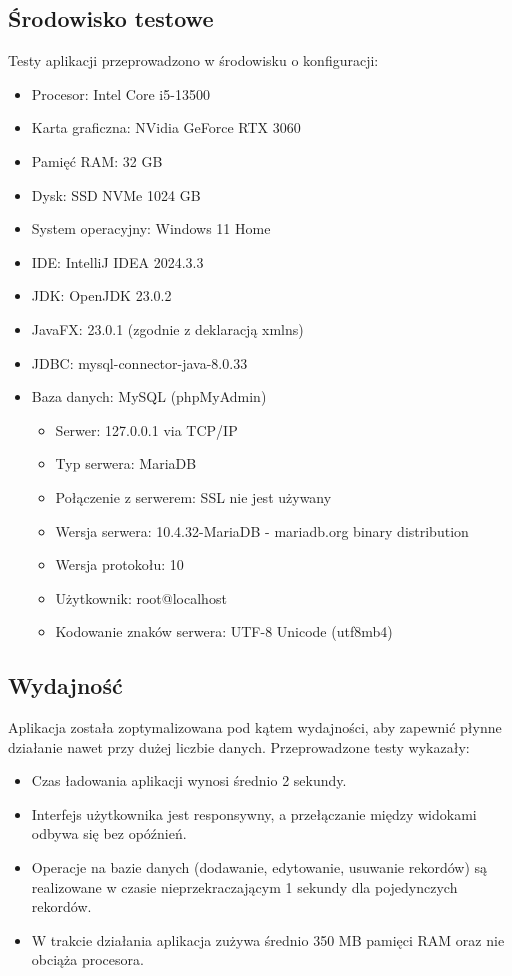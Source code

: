 \subsection{Środowisko testowe}
\label{sec:srodowiskoTestowe}
Testy aplikacji przeprowadzono w środowisku o konfiguracji:
\begin{itemize}
  \item Procesor: Intel Core i5-13500
  \item Karta graficzna: NVidia GeForce RTX 3060
  \item Pamięć RAM: 32 GB
  \item Dysk: SSD NVMe 1024 GB
  \item System operacyjny: Windows 11 Home
  \item IDE: IntelliJ IDEA 2024.3.3
  \item JDK: OpenJDK 23.0.2
  \item JavaFX: 23.0.1 (zgodnie z deklaracją xmlns)
  \item JDBC: mysql-connector-java-8.0.33
  \newpage
  \item Baza danych: MySQL (phpMyAdmin)
    \begin{itemize}
        \item Serwer: 127.0.0.1 via TCP/IP
        \item Typ serwera: MariaDB
        \item Połączenie z serwerem: SSL nie jest używany
        \item Wersja serwera: 10.4.32-MariaDB - mariadb.org binary distribution
        \item Wersja protokołu: 10
        \item Użytkownik: root@localhost
        \item Kodowanie znaków serwera: UTF-8 Unicode (utf8mb4)
    \end{itemize}
\end{itemize}

\subsection{Wydajność}
\label{sec:wydajnosc}
Aplikacja została zoptymalizowana pod kątem wydajności, aby zapewnić płynne działanie nawet przy dużej liczbie danych. Przeprowadzone testy wykazały:
\begin{itemize}
    \item Czas ładowania aplikacji wynosi średnio 2 sekundy.
    \item Interfejs użytkownika jest responsywny, a przełączanie między widokami odbywa się bez opóźnień.
    \item Operacje na bazie danych (dodawanie, edytowanie, usuwanie rekordów) są realizowane w czasie nieprzekraczającym 1 sekundy dla pojedynczych rekordów.
    \item W trakcie działania aplikacja zużywa średnio 350 MB pamięci RAM oraz nie obciąża procesora.
\end{itemize}

